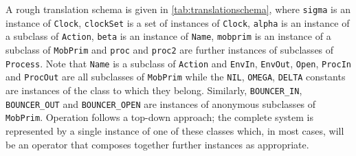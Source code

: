 A rough translation schema is given in \ref{tab:translationschema},
where \texttt{sigma} is an instance of \texttt{Clock},
\texttt{clockSet} is a set of instances of \texttt{Clock},
\texttt{alpha} is an instance of a subclass of \texttt{Action},
\texttt{beta} is an instance of \texttt{Name}, \texttt{mobprim} is an
instance of a subclass of \texttt{MobPrim} and \texttt{proc} and
\texttt{proc2} are further instances of subclasses of
\texttt{Process}.  Note that \texttt{Name} is a subclass of
\texttt{Action} and \texttt{EnvIn}, \texttt{EnvOut}, \texttt{Open},
\texttt{ProcIn} and \texttt{ProcOut} are all subclasses of
\texttt{MobPrim} while the \texttt{NIL}, \texttt{OMEGA},
\texttt{DELTA} constants are instances of the class to which they
belong.  Similarly, \texttt{BOUNCER\_IN}, \texttt{BOUNCER\_OUT} and
\texttt{BOUNCER\_OPEN} are instances of anonymous subclasses of
\texttt{MobPrim}.  Operation follows a top-down approach; the complete
system is represented by a single instance of one of these classes
which, in most cases, will be an operator that composes together
further instances as appropriate.

